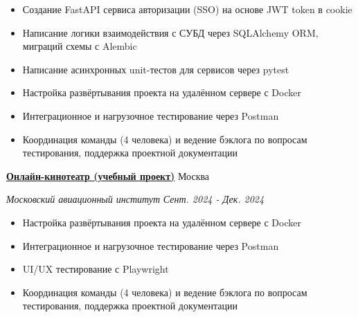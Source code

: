 \documentclass[14pt, a4paper, oneside]{extarticle}
\begin{document}
\begin{itemize}
	\vspace{-0.8\intextsep}
	\item Создание FastAPI сервиса авторизации (SSO) на основе JWT token в cookie
	\vspace{-0.8\intextsep}
	\item Написание логики взаимодействия с СУБД через SQLAlchemy ORM, миграций схемы с Alembic
	\vspace{-0.8\intextsep}
	\item Написание асинхронных unit-тестов для сервисов через pytest
    \vspace{-0.8\intextsep}
    \item Настройка развёртывания проекта на удалённом сервере с Docker
	\vspace{-0.8\intextsep}
	\item Интеграционное и нагрузочное тестирование через Postman
	\vspace{-0.8\intextsep}
    \item Координация команды (4 человека) и ведение бэклога по вопросам тестирования, поддержка проектной документации
\end{itemize}


\begin{flushleft}
	\vspace{-\intextsep}
	\quad
	\href{https://github.com/Crazy5202/Python_project}{\textbf{Онлайн-кинотеатр (учебный проект)}}
	\hfill
	Москва
\end{flushleft}

\begin{flushleft}
	\vspace{-1\intextsep}
	\quad
	\textit{Московский авиационный институт}
	\hfill
	\textit{\small Сент. 2024 - Дек. 2024}
\end{flushleft}


\begin{itemize}
    \vspace{-2\intextsep}
    \item Настройка развёртывания проекта на удалённом сервере с Docker
	\vspace{-0.8\intextsep}
	\item Интеграционное и нагрузочное тестирование через Postman
	\vspace{-0.8\intextsep}
	\item UI/UX тестирование с Playwright
	\vspace{-0.8\intextsep}
    \item Координация команды (4 человека) и ведение бэклога по вопросам тестирования, поддержка проектной документации
\end{itemize}
\end{document}
